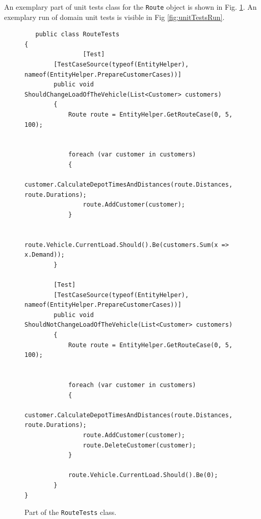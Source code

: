\documentclass[a4paper,twoside,12pt]{book}
\begin{document}
An exemplary part of unit tests class for the \lstinline|Route| object is shown in Fig. \ref{fig:routeUnitTests}.
An exemplary run of domain unit tests is visible in Fig \ref{fig:unitTestsRun}.

\begin{figure}
\centering
\begin{lstlisting}
   public class RouteTests
{
                [Test]
        [TestCaseSource(typeof(EntityHelper), nameof(EntityHelper.PrepareCustomerCases))]
        public void ShouldChangeLoadOfTheVehicle(List<Customer> customers)
        {
            Route route = EntityHelper.GetRouteCase(0, 5, 100);


            foreach (var customer in customers)
            {
                customer.CalculateDepotTimesAndDistances(route.Distances, route.Durations);
                route.AddCustomer(customer);
            }

            route.Vehicle.CurrentLoad.Should().Be(customers.Sum(x => x.Demand));
        }

        [Test]
        [TestCaseSource(typeof(EntityHelper), nameof(EntityHelper.PrepareCustomerCases))]
        public void ShouldNotChangeLoadOfTheVehicle(List<Customer> customers)
        {
            Route route = EntityHelper.GetRouteCase(0, 5, 100);


            foreach (var customer in customers)
            {
                customer.CalculateDepotTimesAndDistances(route.Distances, route.Durations);
                route.AddCustomer(customer);
                route.DeleteCustomer(customer);
            }

            route.Vehicle.CurrentLoad.Should().Be(0);
        }
}

\end{lstlisting}
\caption{Part of the \lstinline|RouteTests| class.}
\label{fig:routeUnitTests}
\end{figure}
\end{document}
